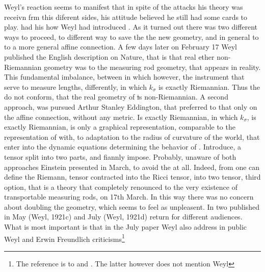 \documentclass[draft]{article}
\begin{document}
 Weyl's reaction seems to manifest that in spite of the attacks his theory was receivn frm this diferent sides, his attitude believed he still had some cards to play. had his how Weyl had introduced . As it turned out there was two different ways to proceed, to different way to save the the new geometry, and in general to to a more general affine connection.  A few days later on February 17 Weyl published the English description on Nature, that is that real ether non-Riemannian geometry was to the measuring rod geometry, that appears in reality. This fundamental imbalance, between in which however, the instrument that serve to measure lengths, differently, in which $k_\sigma$ is exactly Riemannian. Thus the \rac do not conform, that the real geometry of \st is non-Riemannian. A second approach, was pursued Arthur Stanley Eddington, that preferred to that only on the affine connection, without any metric. Is exactly Riemannian, in which $k_\sigma$, is exactly Riemannian, is only a graphical representation, comparable to the representation of with, to adaptation to the radius of curvature of the world, that enter into the dynamic equations determining the behavior of \rac. Introduce, a tensor split into two parts, and fiannly impose. Probably, unaware of both approaches Einstein presented in March, to avoid the \rac at all. Indeed, from one can define the Riemann, tensor contracted into the Ricci tensor, into two tensor, third option, that is a theory that completely renounced to the very existence of transportable measuring rods, on 17th March. In this way there was no concern about doubling the geometry, which seems to feel as unpleasent. In two published in  May (Weyl, 1921c) and July (Weyl, 1921d) return for different audiences. What is most important is that in the July paper Weyl also address in public Weyl and Erwin Freundlich criticisms\footnote{The reference is to \citealp{Reichenbach1920a} and \citealp{Freundlich1920}. The latter however does not mention Weyl}  

\end{document}
